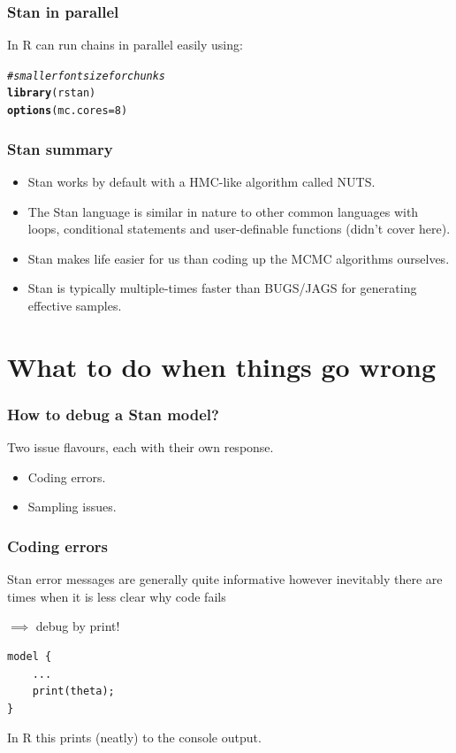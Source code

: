 \documentclass[handout]{beamer}
\makeatletter
\newcommand{\hlnum}[1]{\textcolor[rgb]{0.686,0.059,0.569}{#1}}%
\newcommand{\hlcom}[1]{\textcolor[rgb]{0.678,0.584,0.686}{\textit{#1}}}%
\newcommand{\hlstd}[1]{\textcolor[rgb]{0.345,0.345,0.345}{#1}}%
\newcommand{\hlkwc}[1]{\textcolor[rgb]{0.333,0.667,0.333}{#1}}%
\newcommand{\hlkwd}[1]{\textcolor[rgb]{0.737,0.353,0.396}{\textbf{#1}}}%
\newenvironment{kframe}{%
	\def\at@end@of@kframe{}%
	\ifinner\ifhmode%
	\def\at@end@of@kframe{\end{minipage}}%
\begin{minipage}{\columnwidth}%
	\fi\fi%
	\def\FrameCommand##1{\hskip\@totalleftmargin \hskip-\fboxsep
		\colorbox{shadecolor}{##1}\hskip-\fboxsep
		\hskip-\linewidth \hskip-\@totalleftmargin \hskip\columnwidth}%
	\MakeFramed {\advance\hsize-\width
		\@totalleftmargin\z@ \linewidth\hsize
		\@setminipage}}%
{\par\unskip\endMakeFramed%
	\at@end@of@kframe}
\makeatother
\begin{document}
\begin{frame}[fragile]
	\frametitle{Stan in parallel}
	 In R can run chains in parallel easily using:
	
	\begin{kframe}
	\begin{alltt}
		\hlcom{# smaller font size for chunks}
		\hlkwd{library}\hlstd{(rstan)}
		\hlkwd{options}\hlstd{(}\hlkwc{mc.cores}\hlstd{=}\hlnum{8}\hlstd{)}
	\end{alltt}
\end{kframe}
\end{frame}

\begin{frame}
	\frametitle{Stan summary}
	
	\begin{itemize}
		\item<2-> Stan works by default with a HMC-like algorithm called NUTS.
		\item<3-> The Stan language is similar in nature to other common languages  with loops, conditional statements and user-definable functions (didn't cover here).
		\item<4-> Stan makes life easier for us than coding up the MCMC algorithms ourselves.
		\item<5-> Stan is typically multiple-times faster than BUGS/JAGS for generating effective samples.
	\end{itemize}
	
\end{frame}


\section{What to do when things go wrong}
\frame{\tableofcontents[currentsection]}

\begin{frame}
	\frametitle{How to debug a Stan model?}
	 Two issue flavours, each with their own response.
	
	\begin{itemize}
		\item<2-> Coding errors.
		\item<3-> Sampling issues.
	\end{itemize}
	
\end{frame}

\begin{frame}[fragile]
	\frametitle{Coding errors}
	 Stan error messages are generally quite informative however inevitably there are times when it is less clear why code fails
	
	 $\implies$ debug by print!

\begin{verbatim}
model {
    ...
    print(theta);
}
\end{verbatim}

 In R this prints (neatly) to the console output.
	
\end{frame}
\end{document}
